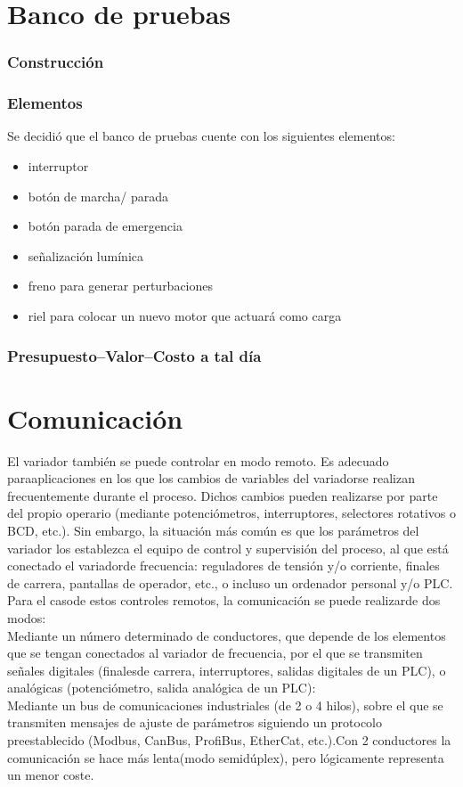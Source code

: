 \documentclass[12pt,a4paper]{article}
\begin{document}
	\part{Banco de pruebas}
		\section{Construcción}
		\section{Elementos}
		Se decidió que el banco de pruebas cuente con los siguientes elementos:
		\begin{itemize}
			\item interruptor
			\item botón de marcha/ parada
			\item botón parada de emergencia
			\item señalización lumínica
			\item freno para generar perturbaciones 
			\item riel para colocar un nuevo motor que actuará como carga
		\end{itemize}
		\section{Presupuesto--Valor--Costo a tal día}
	\newpage
	
	\part{Comunicación}
	
	El   variador   también   se   puede   controlar   en   modo   remoto.   Es   adecuado   paraaplicaciones en   los   que   los   cambios   de   variables   del   variadorse   realizan frecuentemente  durante  el proceso.  Dichos  cambios  pueden  realizarse  por  parte  del propio  operario  (mediante  potenciómetros,  interruptores,  selectores  rotativos  o  BCD, etc.).  Sin  embargo,  la  situación  más  común  es  que  los  parámetros  del  variador  los establezca  el  equipo  de  control  y  supervisión  del  proceso,  al  que  está  conectado  el variadorde  frecuencia: reguladores  de  tensión  y/o  corriente,  finales  de  carrera, pantallas de operador, etc., o incluso un ordenador personal y/o PLC. Para  el  casode  estos  controles  remotos,  la  comunicación  se  puede  realizarde  dos modos:\\Mediante un  número  determinado  de  conductores,  que  depende  de  los elementos que se tengan conectados al variador de frecuencia, por el que se transmiten señales digitales (finalesde carrera, interruptores, salidas digitales de un PLC), o analógicas (potenciómetro, salida analógica de un PLC):\\Mediante un bus de comunicaciones industriales (de 2 o 4 hilos), sobre el que se transmiten   mensajes   de   ajuste   de   parámetros   siguiendo   un   protocolo preestablecido (Modbus, CanBus, ProfiBus, EtherCat, etc.).Con 2  conductores la  comunicación  se  hace  más  lenta(modo  semidúplex),  pero  lógicamente representa un menor coste.
	
\end{document}
